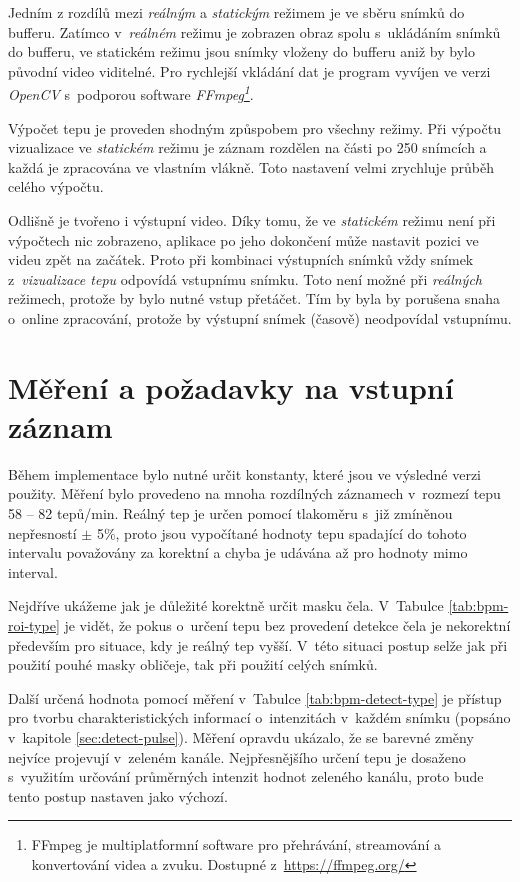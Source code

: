 \documentclass[
  digital, %
  table,   %
%
  lof,     %
  lot,     %
]{fithesis3}
\begin{document}
Jedním z rozdílů mezi \emph{reálným} a \emph{statickým} režimem je ve sběru snímků do bufferu. Zatímco v~\emph{reálném} režimu je zobrazen obraz spolu s~ukládáním snímků do bufferu, ve statickém režimu jsou snímky vloženy do bufferu aniž by bylo původní video viditelné. Pro rychlejší vkládání dat je program vyvíjen ve verzi \emph{OpenCV} s~podporou software \emph{FFmpeg\footnote{FFmpeg je multiplatformní software pro přehrávání, streamování a konvertování videa a zvuku. Dostupné z~\url{https://ffmpeg.org/}}}.

Výpočet tepu je proveden shodným způspobem pro všechny režimy. Při výpočtu vizualizace ve \emph{statickém} režimu je záznam rozdělen na části po 250 snímcích a každá je zpracována ve vlastním vlákně. Toto nastavení velmi zrychluje průběh celého výpočtu.

Odlišně je tvořeno i výstupní video. Díky tomu, že ve \emph{statickém} režimu není při výpočtech nic zobrazeno, aplikace po jeho dokončení může nastavit pozici ve videu zpět na začátek. Proto při kombinaci výstupních snímků vždy snímek z~\emph{vizualizace tepu} odpovídá vstupnímu snímku. Toto není možné při \emph{reálných} režimech, protože by bylo nutné vstup přetáčet. Tím by byla by porušena snaha o~online zpracování, protože by výstupní snímek (časově) neodpovídal vstupnímu.

\section{Měření a požadavky na vstupní záznam}
\label{sec:measure}
Během implementace bylo nutné určit konstanty, které jsou ve výsledné verzi použity. Měření bylo provedeno na mnoha rozdílných záznamech v~rozmezí tepu 58 -- 82 tepů/min. Reálný tep je určen pomocí tlakoměru s~již zmíněnou nepřesností $\pm$ 5\%, proto jsou vypočítané hodnoty tepu spadající do tohoto intervalu považovány za korektní a chyba je udávána až pro hodnoty mimo interval.

Nejdříve ukážeme jak je důležité korektně určit masku čela. V~Tabulce \ref{tab:bpm-roi-type} je vidět, že pokus o~určení tepu bez provedení detekce čela je nekorektní především pro situace, kdy je reálný tep vyšší. V~této situaci postup selže jak při použití pouhé masky obličeje, tak při použití celých snímků.

Další určená hodnota pomocí měření v~Tabulce \ref{tab:bpm-detect-type} je přístup pro tvorbu charakteristických informací o~intenzitách v~každém snímku (popsáno v~kapitole \ref{sec:detect-pulse}). Měření opravdu ukázalo, že se barevné změny nejvíce projevují v~zeleném kanále. Nejpřesnějšího určení tepu je dosaženo s~využitím určování průměrných intenzit hodnot zeleného kanálu, proto bude tento postup nastaven jako výchozí.
\end{document}
